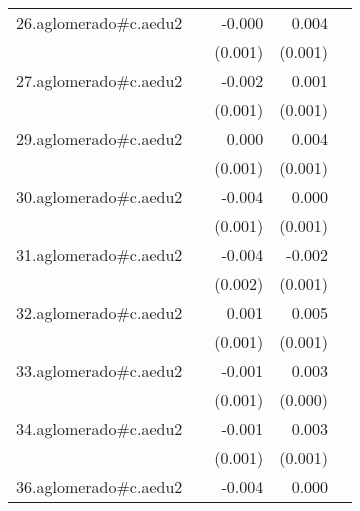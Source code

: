 {\begin{longtable}{l*{4}{D{.}{.}{-1}}}
\addlinespace
26.aglomerado#c.aedu2&                     &      -0.000         &       0.004\sym{***}&                     \\
            &                     &     (0.001)         &     (0.001)         &                     \\
\addlinespace
27.aglomerado#c.aedu2&                     &      -0.002         &       0.001         &                     \\
            &                     &     (0.001)         &     (0.001)         &                     \\
\addlinespace
29.aglomerado#c.aedu2&                     &       0.000         &       0.004\sym{***}&                     \\
            &                     &     (0.001)         &     (0.001)         &                     \\
\addlinespace
30.aglomerado#c.aedu2&                     &      -0.004\sym{**} &       0.000         &                     \\
            &                     &     (0.001)         &     (0.001)         &                     \\
\addlinespace
31.aglomerado#c.aedu2&                     &      -0.004\sym{*}  &      -0.002         &                     \\
            &                     &     (0.002)         &     (0.001)         &                     \\
\addlinespace
32.aglomerado#c.aedu2&                     &       0.001         &       0.005\sym{***}&                     \\
            &                     &     (0.001)         &     (0.001)         &                     \\
\addlinespace
33.aglomerado#c.aedu2&                     &      -0.001         &       0.003\sym{***}&                     \\
            &                     &     (0.001)         &     (0.000)         &                     \\
\addlinespace
34.aglomerado#c.aedu2&                     &      -0.001         &       0.003\sym{**} &                     \\
            &                     &     (0.001)         &     (0.001)         &                     \\
\addlinespace
36.aglomerado#c.aedu2&                     &      -0.004\sym{**} &       0.000         &                     \\

\end{longtable}}
